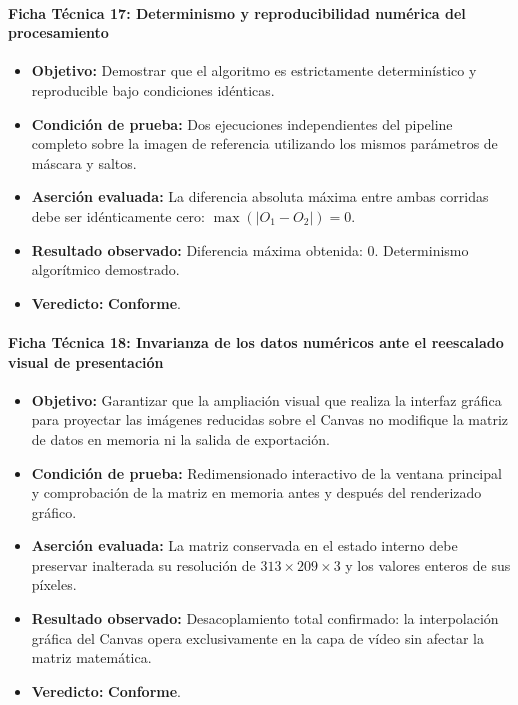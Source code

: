 \documentclass[11pt]{article}
\newcommand{\pruebaok}{\textcolor{verdeExito}{\textbf{Conforme}}}
\begin{document}
\paragraph{Ficha Técnica 17: Determinismo y reproducibilidad numérica del procesamiento}
\begin{itemize}[itemsep=0.15em]
\item \textbf{Objetivo:} Demostrar que el algoritmo es estrictamente determinístico y reproducible bajo condiciones idénticas.
\item \textbf{Condición de prueba:} Dos ejecuciones independientes del pipeline completo sobre la imagen de referencia utilizando los mismos parámetros de máscara y saltos.
\item \textbf{Aserción evaluada:} La diferencia absoluta máxima entre ambas corridas debe ser idénticamente cero: $\max(|O_1 - O_2|) = 0$.
\item \textbf{Resultado observado:} Diferencia máxima obtenida: $0$. Determinismo algorítmico demostrado.
\item \textbf{Veredicto:} \pruebaok.
\end{itemize}

\paragraph{Ficha Técnica 18: Invarianza de los datos numéricos ante el reescalado visual de presentación}
\begin{itemize}[itemsep=0.15em]
\item \textbf{Objetivo:} Garantizar que la ampliación visual que realiza la interfaz gráfica para proyectar las imágenes reducidas sobre el Canvas no modifique la matriz de datos en memoria ni la salida de exportación.
\item \textbf{Condición de prueba:} Redimensionado interactivo de la ventana principal y comprobación de la matriz en memoria antes y después del renderizado gráfico.
\item \textbf{Aserción evaluada:} La matriz conservada en el estado interno debe preservar inalterada su resolución de $313 \times 209 \times 3$ y los valores enteros de sus píxeles.
\item \textbf{Resultado observado:} Desacoplamiento total confirmado: la interpolación gráfica del Canvas opera exclusivamente en la capa de vídeo sin afectar la matriz matemática.
\item \textbf{Veredicto:} \pruebaok.
\end{itemize}
\end{document}
